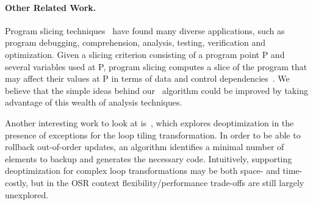 \paragraph*{Other Related Work.} Program slicing techniques~\cite{Weiser82,Weiser84, Korel88, Agrawal90} have found many diverse applications, such as program debugging, comprehension, analysis, testing, verification and optimization. Given a slicing criterion consisting of a program point P and several variables used at P, program slicing computes a slice of the program that may affect their values at P in terms of data and control dependencies~\cite{Tan16}. We believe that the simple ideas behind our \buildcomp\ algorithm could be improved by taking advantage of this wealth of analysis techniques.

Another interesting work to look at is~\cite{Bhandari15}, which explores deoptimization in the presence of exceptions for the loop tiling transformation. In order to be able to rollback out-of-order updates, an algorithm identifies a minimal number of elements to backup and generates the necessary code. Intuitively, supporting deoptimization for complex loop transformations may be both space- and time- costly, but in the OSR context flexibility/performance trade-offs are still largely unexplored.